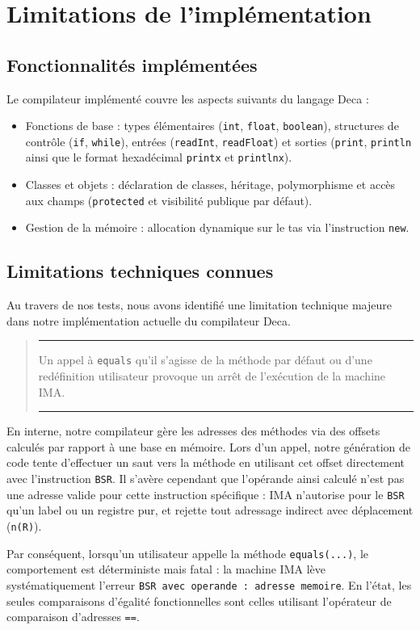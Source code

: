 \section{Limitations de l'implémentation}

\subsection{Fonctionnalités implémentées}
\noindent
Le compilateur implémenté couvre les aspects suivants du langage Deca :
\begin{itemize}[label=$\to$]
    \item Fonctions de base : types élémentaires (\texttt{int}, \texttt{float}, \texttt{boolean}), structures de contrôle (\texttt{if}, \texttt{while}), entrées (\texttt{readInt}, \texttt{readFloat}) et sorties (\texttt{print}, \texttt{println} ainsi que le format hexadécimal \texttt{printx} et \texttt{printlnx}).
    \item Classes et objets : déclaration de classes, héritage, polymorphisme et accès aux champs (\texttt{protected} et visibilité publique par défaut).
    \item Gestion de la mémoire : allocation dynamique sur le tas via l'instruction \texttt{new}.
\end{itemize}

\subsection{Limitations techniques connues}
\noindent
Au travers de nos tests, nous avons identifié une limitation technique majeure dans notre implémentation actuelle du compilateur Deca.

\begin{quote}
    \vspace{5pt}
    \hrule
    Un appel à \texttt{equals} qu'il s'agisse de la méthode par défaut ou d'une redéfinition utilisateur provoque un arrêt de l'exécution de la machine IMA.
    \vspace{5pt}
    \hrule
\end{quote}

\noindent
En interne, notre compilateur gère les adresses des méthodes via des offsets calculés par rapport à une base en mémoire. Lors d'un appel, notre génération de code tente d'effectuer un saut vers la méthode en utilisant cet offset directement avec l'instruction \texttt{BSR}. Il s'avère cependant que l'opérande ainsi calculé n'est pas une adresse valide pour cette instruction spécifique : IMA n'autorise pour le \texttt{BSR} qu'un label ou un registre pur, et rejette tout adressage indirect avec déplacement (\texttt{n(R)}).

\noindent
Par conséquent, lorsqu'un utilisateur appelle la méthode \texttt{equals(...)}, le comportement est déterministe mais fatal : la machine IMA lève systématiquement l'erreur \texttt{BSR avec operande : adresse memoire}. En l'état, les seules comparaisons d'égalité fonctionnelles sont celles utilisant l'opérateur de comparaison d'adresses \texttt{==}.